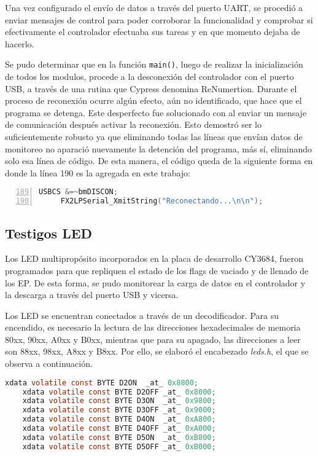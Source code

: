 Una vez configurado el envío de datos a través del puerto UART, se procedió a enviar mensajes de control para poder corroborar la funcionalidad y comprobar si efectivamente el controlador efectuaba sus tareas y en que momento dejaba de hacerlo.

Se pudo determinar que en la función \verb|main()|, luego de realizar la inicialización de todos los modulos, procede a la desconexión del controlador con el puerto USB, a través de una rutina que Cypress denomina ReNumertion\cite{CypressSemiconductor2014fx2lp}. Durante el proceso de reconexión ocurre algún efecto, aún no identificado, que hace que el programa se detenga. Este desperfecto fue solucionado con al enviar un mensaje de comunicación después activar la reconexión. Esto demostró ser lo suficientemente robusto ya que eliminando todas las  líneas que envían datos de monitoreo no aparació nuevamente la detención del programa, más sí, eliminando solo esa línea de código. De esta manera, el código queda de la siguiente forma en donde la línea 190 es la agregada en este trabajo:

\begin{lstlisting}[language=C,backgroundcolor=\color{gray!30},numbers=left,firstnumber=189,basicstyle=\footnotesize]
	 USBCS &=~bmDISCON;
	 FX2LPSerial_XmitString("Reconectando...\n\n");
\end{lstlisting}

\subsection{Testigos LED}
Los LED multipropósito incorporados en la placa de desarrollo CY3684, fueron programados para que repliquen el estado de los flags de vaciado y de llenado de los EP. De esta forma, se pudo monitorear la carga de datos en el controlador y la descarga a través del puerto USB y vicersa.

Los LED se encuentran conectados a través de un decodificador. Para su encendido, es necesario la lectura de las direcciones hexadecimales de memoria 80xx, 90xx, A0xx y B0xx, mientras que para su apagado, las direcciones a leer son  88xx, 98xx, A8xx y B8xx\cite{CypressSemiconductor2014cy3684}. Por ello, se elaboró el encabezado {\it leds.h}, el que se observa a continuación.
	
	\begin{lstlisting}[language=C,backgroundcolor=\color{gray!30}]
	xdata volatile const BYTE D2ON	_at_ 0x8800;
	xdata volatile const BYTE D2OFF	_at_ 0x8000;
	xdata volatile const BYTE D3ON	_at_ 0x9800;
	xdata volatile const BYTE D3OFF	_at_ 0x9000;
	xdata volatile const BYTE D4ON	_at_ 0xA800;
	xdata volatile const BYTE D4OFF	_at_ 0xA000;
	xdata volatile const BYTE D5ON	_at_ 0xB800;
	xdata volatile const BYTE D5OFF	_at_ 0xB000;	\end{lstlisting}
	

